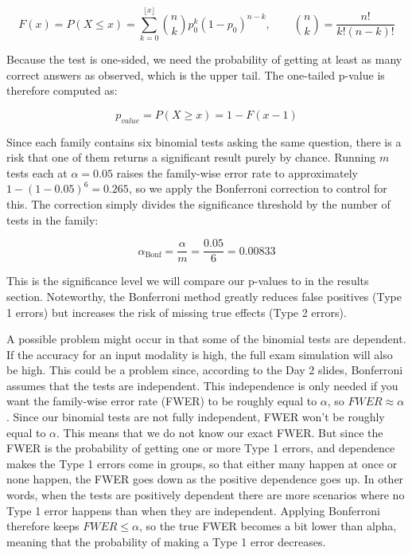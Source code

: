 \documentclass{article}
\begin{document}
$$F(x) = P(X \le x) = \sum_{k=0}^{\lfloor x \rfloor} \binom{n}{k} p_0^{k} (1 - p_0)^{n-k}, \qquad \binom{n}{k} = \frac{n!}{k!(n - k)!}$$

Because the test is one-sided, we need the probability of getting at least as many correct answers as observed, which is the upper tail. The one-tailed p-value is therefore computed as:

$$p_{value} = P(X \ge x) = 1 - F(x-1)$$

Since each family contains six binomial tests asking the same question, there is a risk that one of them returns a significant result purely by chance. Running $m$ tests each at $\alpha = 0.05$ raises the family-wise error rate to approximately $1 - (1-0.05)^6=0.265$, so we apply the Bonferroni correction to control for this. The correction simply divides the significance threshold by the number of tests in the family:

\[
    \alpha_{\text{Bonf}} = \frac{\alpha}{m} = \frac{0.05}{6} = 0.00833
\]

This is the significance level we will compare our p-values to in the results section. Noteworthy, the Bonferroni method greatly reduces false positives (Type 1 errors) but increases the risk of missing true effects (Type 2 errors).

A possible problem might occur in that some of the binomial tests are dependent. If the accuracy for an input modality is high, the full exam simulation will also be high. This could be a problem since, according to the Day 2 slides\supercite{das2026day2}, Bonferroni assumes that the tests are independent. This independence is only needed if you want the family-wise error rate (FWER) to be roughly equal to $\alpha$, so $FWER \approx \alpha$. Since our binomial tests are not fully independent, FWER won't be roughly equal to $\alpha$. This means that we do not know our exact FWER. But since the FWER is the probability of getting one or more Type 1 errors, and dependence makes the Type 1 errors come in groups, so that either many happen at once or none happen, the FWER goes down as the positive dependence goes up. In other words, when the tests are positively dependent there are more scenarios where no Type 1 error happens than when they are independent. Applying Bonferroni therefore keeps $FWER \le \alpha$, so the true FWER becomes a bit lower than alpha, meaning that the probability of making a Type 1 error decreases. 
\end{document}
